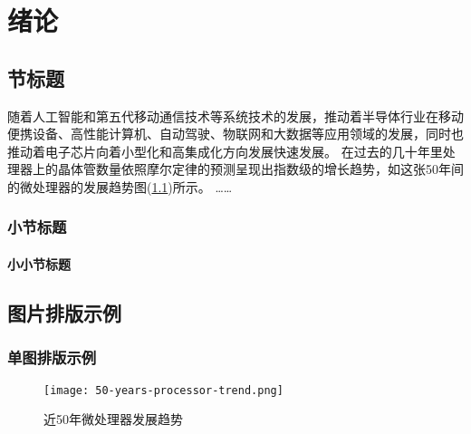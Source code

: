
\chapter{绪论}\label{ch:1}
\section{节标题}

    随着人工智能和第五代移动通信技术等系统技术的发展\cite{Lau_2022}，推动着半导体行业在移动便携设备、高性能计算机、自动驾驶、物联网和大数据等应用领域的发展\cite{Lau_2022}，同时也推动着电子芯片向着小型化和高集成化方向发展快速发展\cite{Sadique.Murtaza.ea_2022}。
在过去的几十年里处理器上的晶体管数量依照摩尔定律\cite{Tan.Du.ea_2021}的预测呈现出指数级的增长趋势，如这张50年间的微处理器的发展趋势图(\cref{fig:processor-trend})所示。
……

\subsection{小节标题}
\subsubsection{小小节标题}

\section{图片排版示例}
\subsection{单图排版示例}

\begin{figure}[htb]
    \texttt{[image: 50-years-processor-trend.png]}
    \caption[处理器发展]{近50年微处理器发展趋势} %
    \label{fig:processor-trend}
\end{figure}

